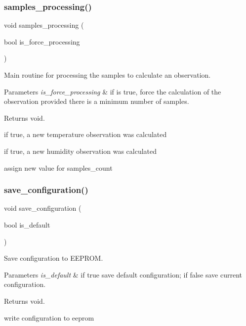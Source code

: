 \subsubsection{\texorpdfstring{samples\+\_\+processing()}{samples\_processing()}}
{\footnotesize\ttfamily void samples\+\_\+processing (\begin{DoxyParamCaption}\item[{bool}]{is\+\_\+force\+\_\+processing }\end{DoxyParamCaption})}



Main routine for processing the samples to calculate an observation. 


\begin{DoxyParams}{Parameters}
{\em is\+\_\+force\+\_\+processing} & if is true, force the calculation of the observation provided there is a minimum number of samples. \\
\hline
\end{DoxyParams}
\begin{DoxyReturn}{Returns}
void. 
\end{DoxyReturn}
if true, a new temperature observation was calculated

if true, a new humidity observation was calculated

assign new value for samples\+\_\+count \mbox{\label{i2c-th_8h_a8801fa7c9f323c5b8b9b2bb5b1c438ff}} 
\subsubsection{\texorpdfstring{save\+\_\+configuration()}{save\_configuration()}}
{\footnotesize\ttfamily void save\+\_\+configuration (\begin{DoxyParamCaption}\item[{bool}]{is\+\_\+default }\end{DoxyParamCaption})}



Save configuration to E\+E\+P\+R\+OM. 


\begin{DoxyParams}{Parameters}
{\em is\+\_\+default} & if true save default configuration; if false save current configuration. \\
\hline
\end{DoxyParams}
\begin{DoxyReturn}{Returns}
void. 
\end{DoxyReturn}
write configuration to eeprom \mbox{\label{i2c-th_8h_af0e8965583b124096972fe3a9e0e7954}} 
